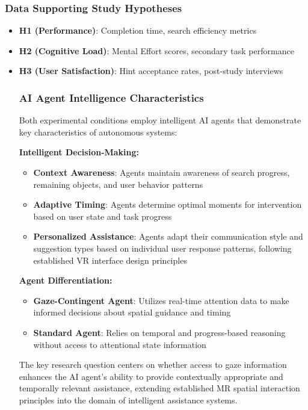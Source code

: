 \documentclass[12pt,letterpaper]{article}
\begin{document}
\subsubsection{Data Supporting Study Hypotheses}
\begin{itemize}
    \item \textbf{H1 (Performance)}: Completion time, search efficiency metrics
    \item \textbf{H2 (Cognitive Load)}: Mental Effort scores, secondary task performance
    \item \textbf{H3 (User Satisfaction)}: Hint acceptance rates, post-study interviews

\subsubsection{AI Agent Intelligence Characteristics}

Both experimental conditions employ intelligent AI agents that demonstrate key characteristics of autonomous systems:

\textbf{Intelligent Decision-Making:}
\begin{itemize}
    \item \textbf{Context Awareness}: Agents maintain awareness of search progress, remaining objects, and user behavior patterns
    \item \textbf{Adaptive Timing}: Agents determine optimal moments for intervention based on user state and task progress
    \item \textbf{Personalized Assistance}: Agents adapt their communication style and suggestion types based on individual user response patterns, following established VR interface design principles \citep{schleusissinger2021information}
\end{itemize}

\textbf{Agent Differentiation:}
\begin{itemize}
    \item \textbf{Gaze-Contingent Agent}: Utilizes real-time attention data to make informed decisions about spatial guidance and timing
    \item \textbf{Standard Agent}: Relies on temporal and progress-based reasoning without access to attentional state information
\end{itemize}

The key research question centers on whether access to gaze information enhances the AI agent's ability to provide contextually appropriate and temporally relevant assistance, extending established MR spatial interaction principles \citep{barba2017primer} into the domain of intelligent assistance systems.
\end{itemize}
\end{document}
